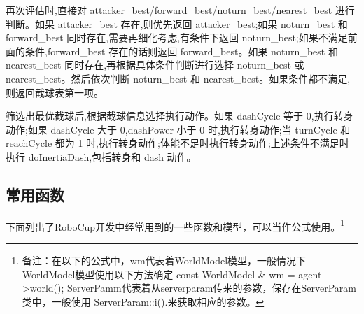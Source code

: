 再次评估时,直接对 attacker_best/forward_best/noturn_best/nearest_best 进行判断。如果 attacker_best 存在,则优先返回 attacker_best;如果 noturn_best 和 forward_best 同时存在,需要再细化考虑,有条件下返回 noturn_best;如果不满足前面的条件,forward_best 存在的话则返回 forward_best。如果 noturn_best 和 nearest_best 同时存在,再根据具体条件判断进行选择 noturn_best 或 nearest_best。然后依次判断 noturn_best 和 nearest_best。如果条件都不满足,则返回截球表第一项。

筛选出最优截球后,根据截球信息选择执行动作。如果 dashCycle 等于 0,执行转身动作;如果 dashCycle 大于 0,dashPower 小于 0 时,执行转身动作;当 turnCycle 和 reachCycle 都为 1 时,执行转身动作;体能不足时执行转身动作;上述条件不满足时执行 doInertiaDash,包括转身和 dash 动作。


\subsection{常用函数}
下面列出了RoboCup开发中经常用到的一些函数和模型，可以当作公式使用。\footnote{备注：在以下的公式中，wm代表着WorldModel模型，一般情况下WorldModel模型使用以下方法确定 const WorldModel \& wm = agent->world();	ServerPamm代表着从serverparam传来的参数，保存在ServerParam类中，一般使用 ServerParam::i().来获取相应的参数。}

